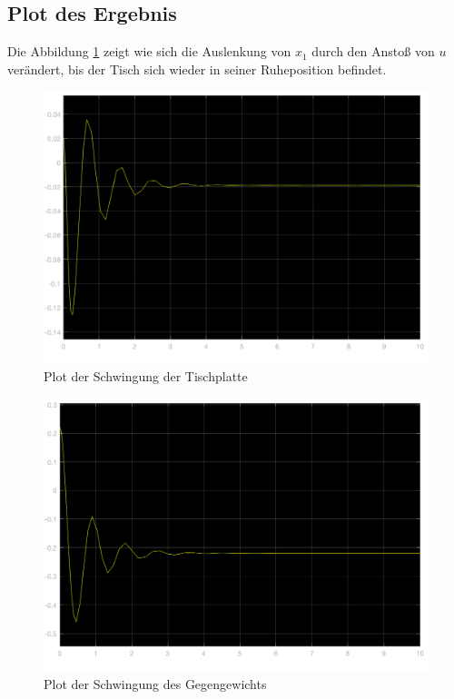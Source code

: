 \documentclass[]{scrartcl}
\begin{document}
\subsection{Plot des Ergebnis}
Die Abbildung \ref{fig:4_Plot} zeigt wie sich die Auslenkung von $x_{1}$ durch den Anstoß von $u$ verändert, bis der Tisch sich wieder in seiner Ruheposition befindet.

\begin{figure}[H]
\centering
\includegraphics[width=0.8\linewidth]{./4_Plot_x1}
\caption{Plot der Schwingung der Tischplatte}
\label{fig:4_Plot}
\end{figure}

\begin{figure}[H]
\centering
\includegraphics[width=0.8\linewidth]{./4_Plot_x2}
\caption{Plot der Schwingung des Gegengewichts}
\label{fig:4_Plot_x2}
\end{figure}
\end{document}
